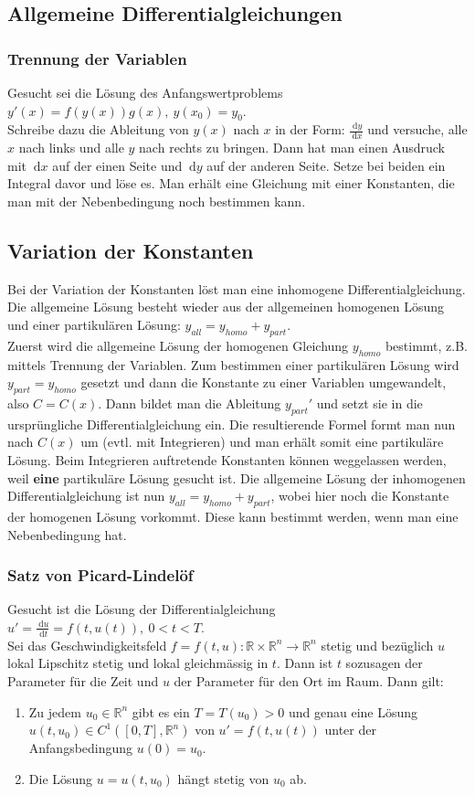 \documentclass[a4paper,10pt]{scrartcl}
\newcommand{\diff}{\ \mathrm{d}}
\begin{document}
\subsection{Allgemeine Differentialgleichungen}
\subsubsection{Trennung der Variablen}
Gesucht sei die Lösung des Anfangswertproblems $y'(x)=f(y(x))g(x),\ y(x_{0})=y_{0}$. \\
Schreibe dazu die Ableitung von $y(x)$ nach $x$ in der Form: $\frac{\diff y}{\diff x}$ und versuche, alle $x$ nach links und alle $y$ nach rechts zu bringen. Dann hat man einen Ausdruck mit $\diff x$ auf der einen Seite und $\diff y$ auf der anderen Seite. Setze bei beiden ein Integral davor und löse es. Man erhält eine Gleichung mit einer Konstanten, die man mit der Nebenbedingung noch bestimmen kann. 
\subsection{Variation der Konstanten}
Bei der Variation der Konstanten löst man eine inhomogene Differentialgleichung. Die allgemeine Lösung besteht wieder aus der allgemeinen homogenen Lösung und einer partikulären Lösung: $y_{all}= y_{homo}+y_{part}$. \\
Zuerst wird die allgemeine Lösung der homogenen Gleichung $y_{homo}$ bestimmt, z.B. mittels Trennung der Variablen. Zum bestimmen einer partikulären Lösung wird $y_{part}=y_{homo}$  gesetzt und dann die Konstante zu einer Variablen umgewandelt, also $C=C(x)$. Dann bildet man die Ableitung $y_{part}'$ und setzt sie in die ursprüngliche Differentialgleichung ein. Die resultierende Formel formt man nun nach $C(x)$ um (evtl. mit Integrieren) und man erhält somit eine partikuläre Lösung. Beim Integrieren auftretende Konstanten können weggelassen werden, weil \textbf{eine} partikuläre Lösung gesucht ist. Die allgemeine Lösung der inhomogenen Differentialgleichung ist nun $y_{all}= y_{homo}+y_{part}$, wobei hier noch die Konstante der homogenen Lösung vorkommt. Diese kann bestimmt werden, wenn man eine Nebenbedingung hat. 
\subsubsection{Satz von Picard-Lindelöf}
Gesucht ist die Lösung der Differentialgleichung $u'=\frac{\diff u}{\diff t}= f(t,u(t)), \ 0<t<T$. \\
Sei das Geschwindigkeitsfeld $f=f(t,u):\mathbb{R}\times\mathbb{R}^n \to \mathbb{R}^n$ stetig und bezüglich $u$ lokal Lipschitz stetig und lokal gleichmässig in $t$. Dann ist $t$ sozusagen der Parameter für die Zeit und $u$ der Parameter für den Ort im Raum. Dann gilt:
\begin{enumerate}[label=\roman*)]
	\item Zu jedem $u_0\in\mathbb{R}^n$ gibt es ein $T=T(u_0)> 0$ und genau eine Lösung $u(t,u_0)\in C^1([0,T],\mathbb{R}^n)$ von $u'=f(t,u(t))$ unter der Anfangsbedingung $u(0)=u_0$.
	\item Die Lösung $u=u(t,u_0)$ hängt stetig von $u_0$ ab.
\end{enumerate}
\end{document}

